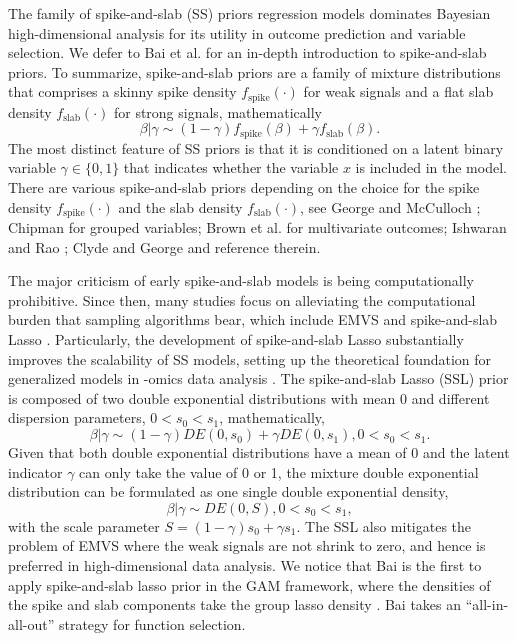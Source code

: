 \documentclass[AMA,STIX1COL,]{WileyNJD-v2}
\begin{document}
The family of spike-and-slab (SS) priors regression models dominates
Bayesian high-dimensional analysis for its utility in outcome prediction
and variable selection. We defer to Bai et al. \citep{Bai2021Review} for
an in-depth introduction to spike-and-slab priors. To summarize,
spike-and-slab priors are a family of mixture distributions that
comprises a skinny spike density \(f_{\text{spike}}(\cdot)\) for weak
signals and a flat slab density \(f_{\text{slab}}(\cdot)\) for strong
signals, mathematically \[
 \beta|\gamma \sim (1-\gamma)f_{\text{spike}}(\beta) + \gamma f_{\text{slab}}(\beta).
\] The most distinct feature of SS priors is that it is conditioned on a
latent binary variable \(\gamma \in \{0,1\}\) that indicates whether the
variable \(x\) is included in the model. There are various
spike-and-slab priors depending on the choice for the spike density
\(f_{\text{spike}}(\cdot)\) and the slab density
\(f_{\text{slab}}(\cdot)\), see George and McCulloch
\citep{George1993, George1997}; Chipman \citep{Chipman1996} for grouped
variables; Brown et al. \citep{Brown1998} for multivariate outcomes;
Ishwaran and Rao \citep{Ishwaran2005}; Clyde and George
\citep{Clyde2004} and reference therein.

The major criticism of early spike-and-slab models is being
computationally prohibitive. \citep{Bai2021Review} Since then, many
studies focus on alleviating the computational burden that sampling
algorithms bear, which include EMVS \citep{Rockova2014a} and
spike-and-slab Lasso \citep{Rockova2018b, Rockova2018}. Particularly,
the development of spike-and-slab Lasso substantially improves the
scalability of SS models, setting up the theoretical foundation for
generalized models in -omics data analysis
\citep{Tang2017a, Tang2017, Tang2018, Tang2019}. The spike-and-slab
Lasso (SSL) prior is composed of two double exponential distributions
with mean 0 and different dispersion parameters, \(0 < s_0 < s_1\),
mathematically, \begin{equation} 
\beta | \gamma \sim (1-\gamma)DE(0, s_0) + \gamma DE(0, s_1), 0 < s_0 < s_1.\nonumber
\end{equation} Given that both double exponential distributions have a
mean of 0 and the latent indicator \(\gamma\) can only take the value of
0 or 1, the mixture double exponential distribution can be formulated as
one single double exponential density, \begin{equation} \label{eq:ssl}
\beta | \gamma \sim DE(0, S), 0 < s_0 < s_1,
\end{equation} with the scale parameter
\(S = (1-\gamma)s_0 + \gamma s_1\). The SSL also mitigates the problem
of EMVS where the weak signals are not shrink to zero, and hence is
preferred in high-dimensional data analysis. We notice that Bai
\citep{Bai2021} is the first to apply spike-and-slab lasso prior in the
GAM framework, where the densities of the spike and slab components take
the group lasso density \citep{Xu2015}. Bai \citep{Bai2021} takes an
``all-in-all-out'' strategy for function selection.
\end{document}
